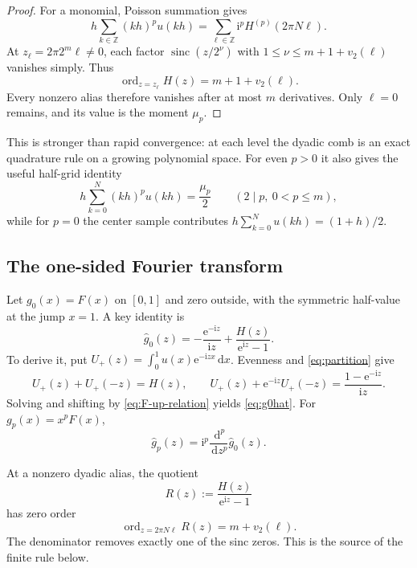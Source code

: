 \documentclass[11pt]{article}
\theoremstyle{definition}
\theoremstyle{remark}
\newcommand{\sinc}{\operatorname{sinc}}
\newcommand{\e}{\mathrm e}
\newcommand{\ii}{\mathrm i}
\newcommand{\Z}{\mathbb Z}
\newcommand{\dd}{\,\mathrm d}
\begin{document}
\begin{proof}
For a monomial, Poisson summation gives
\[
 h\sum_{k\in\Z}(kh)^pu(kh)
 =\sum_{\ell\in\Z}\ii^pH^{(p)}(2\pi N\ell).
\]
At $z_\ell=2\pi2^m\ell\ne0$, each factor
$\sinc(z/2^\nu)$ with
$1\le\nu\le m+1+v_2(\ell)$ vanishes simply.  Thus
\begin{equation}\label{eq:zero-order}
 \operatorname{ord}_{z=z_\ell}H(z)=m+1+v_2(\ell).
\end{equation}
Every nonzero alias therefore vanishes after at most $m$ derivatives.  Only
$\ell=0$ remains, and its value is the moment $\mu_p$.
\end{proof}

This is stronger than rapid convergence: at each level the dyadic comb is an
exact quadrature rule on a growing polynomial space.  For even $p>0$ it also
gives the useful half-grid identity
\begin{equation}\label{eq:up-half-even}
 h\sum_{k=0}^{N}(kh)^pu(kh)=\frac{\mu_p}{2}\qquad(2\mid p,\ 0<p\le m),
\end{equation}
while for $p=0$ the center sample contributes
\(
 h\sum_{k=0}^{N}u(kh)=(1+h)/2.
\)

\subsection{The one-sided Fourier transform}

Let $g_0(x)=F(x)$ on $[0,1]$ and zero outside, with the symmetric half-value at
the jump $x=1$.  A key identity is
\begin{equation}\label{eq:g0hat}
 \widehat g_0(z)
 =-\frac{\e^{-\ii z}}{\ii z}+\frac{H(z)}{\e^{\ii z}-1}.
\end{equation}
To derive it, put
$U_+(z)=\int_0^1u(x)\e^{-\ii zx}\dd x$.  Evenness and
\eqref{eq:partition} give
\[
 U_+(z)+U_+(-z)=H(z),
 \qquad
 U_+(z)+\e^{-\ii z}U_+(-z)=\frac{1-\e^{-\ii z}}{\ii z}.
\]
Solving and shifting by \eqref{eq:F-up-relation} yields
\eqref{eq:g0hat}.  For $g_p(x)=x^pF(x)$,
\begin{equation}\label{eq:gphat}
 \widehat g_p(z)=\ii^p\frac{\dd^p}{\dd z^p}\widehat g_0(z).
\end{equation}

At a nonzero dyadic alias, the quotient
\begin{equation}\label{eq:Rz}
 R(z):=\frac{H(z)}{\e^{\ii z}-1}
\end{equation}
has zero order
\begin{equation}\label{eq:R-order}
 \operatorname{ord}_{z=2\pi N\ell}R(z)=m+v_2(\ell).
\end{equation}
The denominator removes exactly one of the sinc zeros.  This is the source of
the finite rule below.
\end{document}
